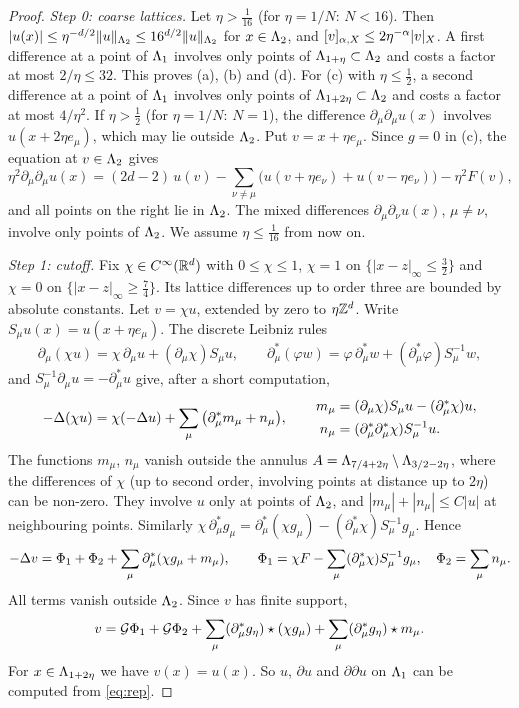 \begin{proof}
\emph{Step 0: coarse lattices.} Let $\eta>\frac1{16}$ (for $\eta=1/N$: $N<16$). Then $|u(x)|\le\eta^{-d/2}\|u\|_{\Lambda_2}\le16^{d/2}\|u\|_{\Lambda_2}$ for $x\in\Lambda_2$, and $[v]_{\alpha,X}\le2\eta^{-\alpha}|v|_X$. A first difference at a point of $\Lambda_1$ involves only points of $\Lambda_{1+\eta}\subset\Lambda_2$ and costs a factor at most $2/\eta\le32$. This proves (a), (b) and (d). For (c) with $\eta\le\frac12$, a second difference at a point of $\Lambda_1$ involves only points of $\Lambda_{1+2\eta}\subset\Lambda_2$ and costs a factor at most $4/\eta^2$. If $\eta>\frac12$ (for $\eta=1/N$: $N=1$), the difference $\partial_\mu\partial_\mu u(x)$ involves $u(x+2\eta e_\mu)$, which may lie outside $\Lambda_2$. Put $v=x+\eta e_\mu$. Since $g=0$ in (c), the equation at $v\in\Lambda_2$ gives
\[
\eta^2\partial_\mu\partial_\mu u(x)=(2d-2)\,u(v)-\sum_{\nu\ne\mu}\big(u(v+\eta e_\nu)+u(v-\eta e_\nu)\big)-\eta^2F(v),
\]
and all points on the right lie in $\Lambda_2$. The mixed differences $\partial_\mu\partial_\nu u(x)$, $\mu\ne\nu$, involve only points of $\Lambda_2$. We assume $\eta\le\frac1{16}$ from now on.

\emph{Step 1: cutoff.} Fix $\chi\in C^\infty(\mathbb R^d)$ with $0\le\chi\le1$, $\chi=1$ on $\{|x-z|_\infty\le\frac32\}$ and $\chi=0$ on $\{|x-z|_\infty\ge\frac74\}$. Its lattice differences up to order three are bounded by absolute constants. Let $v=\chi u$, extended by zero to $\eta\mathbb Z^d$. Write $S_\mu u(x)=u(x+\eta e_\mu)$. The discrete Leibniz rules
\[
\partial_\mu(\chi u)=\chi\,\partial_\mu u+(\partial_\mu\chi)S_\mu u,\qquad
\partial_\mu^*(\varphi w)=\varphi\,\partial^*_\mu w+(\partial^*_\mu\varphi)S_\mu^{-1}w,
\]
and $S_\mu^{-1}\partial_\mu u=-\partial^*_\mu u$ give, after a short computation,
\begin{equation}\label{eq:commutator}
-\Delta(\chi u)=\chi(-\Delta u)+\sum_\mu\big(\partial^*_\mu m_\mu+n_\mu\big),\qquad
\begin{aligned}
m_\mu&=(\partial_\mu\chi)S_\mu u-(\partial^*_\mu\chi)u,\\
n_\mu&=(\partial^*_\mu\partial^*_\mu\chi)S_\mu^{-1}u .
\end{aligned}
\end{equation}
The functions $m_\mu$, $n_\mu$ vanish outside the annulus $A=\Lambda_{7/4+2\eta}\setminus\Lambda_{3/2-2\eta}$, where the differences of $\chi$ (up to second order, involving points at distance up to $2\eta$) can be non-zero. They involve $u$ only at points of $\Lambda_2$, and $|m_\mu|+|n_\mu|\le C|u|$ at neighbouring points. Similarly $\chi\,\partial^*_\mu g_\mu=\partial^*_\mu(\chi g_\mu)-(\partial^*_\mu\chi)S_\mu^{-1}g_\mu$. Hence
\[
-\Delta v=\Phi_1+\Phi_2+\sum_\mu\partial^*_\mu(\chi g_\mu+m_\mu),\qquad
\Phi_1=\chi F-\sum_\mu(\partial^*_\mu\chi)S^{-1}_\mu g_\mu,\quad \Phi_2=\sum_\mu n_\mu .
\]
All terms vanish outside $\Lambda_2$. Since $v$ has finite support,
\begin{equation}\label{eq:rep}
v=\mathcal G\Phi_1+\mathcal G\Phi_2+\sum_\mu(\partial^*_\mu g_\eta)\star(\chi g_\mu)+\sum_\mu(\partial^*_\mu g_\eta)\star m_\mu .
\end{equation}
For $x\in\Lambda_{1+2\eta}$ we have $v(x)=u(x)$. So $u$, $\partial u$ and $\partial\partial u$ on $\Lambda_1$ can be computed from \eqref{eq:rep}.


\end{proof}
